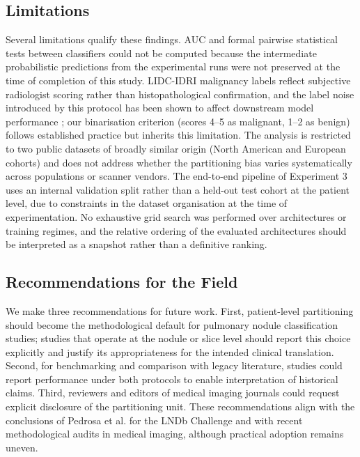 \documentclass{ieeeaccess}
\begin{document}
\subsection{Limitations}
\label{sec:limitations}
Several limitations qualify these findings. AUC and formal pairwise statistical tests between classifiers could not be computed because the intermediate probabilistic predictions from the experimental runs were not preserved at the time of completion of this study. LIDC-IDRI malignancy labels reflect subjective radiologist scoring rather than histopathological confirmation, and the label noise introduced by this protocol has been shown to affect downstream model performance \cite{lei2022}; our binarisation criterion (scores 4--5 as malignant, 1--2 as benign) follows established practice but inherits this limitation. The analysis is restricted to two public datasets of broadly similar origin (North American and European cohorts) and does not address whether the partitioning bias varies systematically across populations or scanner vendors. The end-to-end pipeline of Experiment 3 uses an internal validation split rather than a held-out test cohort at the patient level, due to constraints in the dataset organisation at the time of experimentation. No exhaustive grid search was performed over architectures or training regimes, and the relative ordering of the evaluated architectures should be interpreted as a snapshot rather than a definitive ranking.

\subsection{Recommendations for the Field}
We make three recommendations for future work. First, patient-level partitioning should become the methodological default for pulmonary nodule classification studies; studies that operate at the nodule or slice level should report this choice explicitly and justify its appropriateness for the intended clinical translation. Second, for benchmarking and comparison with legacy literature, studies could report performance under both protocols to enable interpretation of historical claims. Third, reviewers and editors of medical imaging journals could request explicit disclosure of the partitioning unit. These recommendations align with the conclusions of Pedrosa et al. \cite{pedrosa2021} for the LNDb Challenge and with recent methodological audits in medical imaging, although practical adoption remains uneven.
\end{document}
